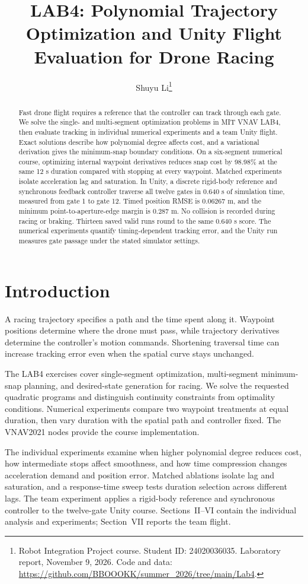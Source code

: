 \documentclass[letterpaper,10pt,conference]{ieeeconf}
\title{\LARGE\bf LAB4: Polynomial Trajectory Optimization and Unity Flight Evaluation for Drone Racing}
\author{Shuyu Li\thanks{Robot Integration Project course. Student ID: 24020036035. Laboratory report, November 9, 2026. Code and data: \url{https://github.com/BBOOOKK/summer_2026/tree/main/Lab4}.}}
\begin{document}
\maketitle
\thispagestyle{empty}\pagestyle{empty}
\begin{abstract}
Fast drone flight requires a reference that the controller can track through each gate.
We solve the single- and multi-segment optimization problems in MIT VNAV LAB4, then evaluate tracking in individual numerical experiments and a team Unity flight.
Exact solutions describe how polynomial degree affects cost, and a variational derivation gives the minimum-snap boundary conditions.
On a six-segment numerical course, optimizing internal waypoint derivatives reduces snap cost by 98.98\% at the same 12 s duration compared with stopping at every waypoint.
Matched experiments isolate acceleration lag and saturation.
In Unity, a discrete rigid-body reference and synchronous feedback controller traverse all twelve gates in 0.640 s of simulation time, measured from gate 1 to gate 12.
Timed position RMSE is 0.06267 m, and the minimum point-to-aperture-edge margin is 0.287 m.
No collision is recorded during racing or braking.
Thirteen saved valid runs round to the same 0.640 s score.
The numerical experiments quantify timing-dependent tracking error, and the Unity run measures gate passage under the stated simulator settings.
\end{abstract}
\section{Introduction}
A racing trajectory specifies a path and the time spent along it.
Waypoint positions determine where the drone must pass, while trajectory derivatives determine the controller's motion commands.
Shortening traversal time can increase tracking error even when the spatial curve stays unchanged.

The LAB4 exercises\cite{mit} cover single-segment optimization, multi-segment minimum-snap planning, and desired-state generation for racing.
We solve the requested quadratic programs and distinguish continuity constraints from optimality conditions.
Numerical experiments compare two waypoint treatments at equal duration, then vary duration with the spatial path and controller fixed.
The VNAV2021 nodes\cite{code} provide the course implementation.

The individual experiments examine when higher polynomial degree reduces cost, how intermediate stops affect smoothness, and how time compression changes acceleration demand and position error.
Matched ablations isolate lag and saturation, and a response-time sweep tests duration selection across different lags.
The team experiment applies a rigid-body reference and synchronous controller to the twelve-gate Unity course.
Sections~II--VI contain the individual analysis and experiments; Section~VII reports the team flight.
\end{document}

